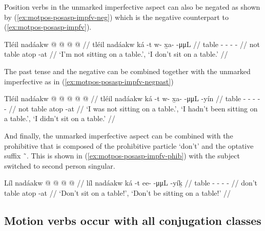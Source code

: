 \documentclass[12pt,letterpaper,oneside,article]{memoir}
\begin{document}
Position verbs in the unmarked imperfective aspect can also be negated as shown by (\ref{ex:motpos-posasp-impfv-neg}) which is the negative counterpart to (\ref{ex:motpos-posasp-impfv}).

\ex\label{ex:motpos-posasp-impfv-neg}%
%
\begingl
	\gla	Tléil nadáakw  @ {}  @ {} @ {} @ {} //
	\glb	tléil nadáakw ká -t w- x̱a-  -μμL //
	\glc	{} table  - - -  - //
	\gld	not table atop -at  {} {} {} //
	\glft	‘I’m not sitting on a table.’, ‘I don’t sit on a table.’
		//
\endgl
\xe

The past tense and the negative can be combined together with the unmarked imperfective as in (\ref{ex:motpos-posasp-impfv-negpast})

\ex\label{ex:motpos-posasp-impfv-negpast}%
%
\begingl
	\gla	Tléil nadáakw  @ {}  @ {} @ {} @ {} @ {} //
	\glb	tléil nadáakw ká -t w- x̱a-  -μμL -yín //
	\glc	{} table  - - -  - - //
	\gld	not table atop -at  {} {} {} {} //
	\glft	‘I was not sitting on a table.’, ‘I hadn’t been sitting on a table.’, ‘I didn’t sit on a table.’
		//
\endgl
\xe

And finally, the unmarked imperfective aspect can be combined with the prohibitive that is composed of the prohibitive particle  ‘don’t’ and the optative suffix  \~\ .
This is shown in (\ref{ex:motpos-posasp-impfv-phib}) with the subject switched to second person singular.

\ex\label{ex:motpos-posasp-impfv-phib}%
%
\begingl
	\gla	Líl nadáakw  @ {}  @ {} @ {} @ {} //
	\glb	líl nadáakw ká -t ee-  -μμL -yíḵ //
	\glc	{} table  - -  - - //
	\gld	don’t table atop -at  {} {} {} //
	\glft	‘Don’t sit on a table!’, ‘Don’t be sitting on a table!’
		//
\endgl
\xe

\subsection{Motion verbs occur with all conjugation classes}\label{sec:motpos-motconj}
\end{document}
